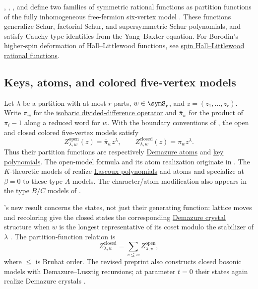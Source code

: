 , , , and
 define two families of symmetric rational functions as
partition functions of the fully inhomogeneous free-fermion six-vertex model
\cite{AggarwalBorodinPetrovWheeler2023}.  These functions generalize Schur,
factorial Schur, and supersymmetric Schur polynomials, and satisfy Cauchy-type
identities from the Yang--Baxter equation.
For Borodin's higher-spin deformation of Hall--Littlewood functions,
see \hyperref[spinHallLittlewoodRationalFunction]{spin Hall--Littlewood rational functions}.

\subsection[latticeModelDemazure]{Keys, atoms, and colored five-vertex models}

Let $\lambda$ be a partition with at most $r$ parts, $w\in\symS_r$,
and $z=(z_1,\ldots,z_r)$.
Write $\pi_w$ for the
\hyperref[keyDefinitionOperators]{isobaric divided-difference operator}
and $\bar\pi_w$ for the product of $\pi_i-1$ along a reduced word for $w$.
With the boundary conventions of \cite[Sec.~1.1]{Yang2025x}, the open and
closed colored five-vertex models satisfy
\[
 Z^{\mathrm{open}}_{\lambda,w}(z)=\bar\pi_w z^\lambda,
 \qquad
 Z^{\mathrm{closed}}_{\lambda,w}(z)=\pi_w z^\lambda.
\]
Thus their partition functions are respectively
\hyperref[atom]{Demazure atoms} and \hyperref[key]{key polynomials}.
The open-model formula and its atom realization originate in
\cite{BrubakerBuciumasBumpGustafsson2021}.
The $K$-theoretic models of
\cite[Thms.~3.4 and~3.6]{BuciumasScrimshawWeber2020} realize
\hyperref[lascoux]{Lascoux polynomials} and atoms and specialize at
$\beta=0$ to these type $A$ models.
The character/atom modification also appears in the
type $B/C$ models of \cite{BuciumasScrimshaw2022}.

's new result concerns the states, not just their generating function:
lattice moves and recoloring give the closed states the corresponding
\hyperref[crystals]{Demazure crystal} structure
when $w$ is the longest representative of its coset modulo the stabilizer
of $\lambda$ \cite[Thm.~1.2]{Yang2025x}. The partition-function relation is
\[
 Z^{\mathrm{closed}}_{\lambda,w}
 =\sum_{v\leq w} Z^{\mathrm{open}}_{\lambda,v},
\]
where $\leq$ is Bruhat order. The revised preprint also constructs closed
bosonic models with Demazure--Lusztig recursions; at parameter $t=0$ their
states again realize Demazure crystals \cite[Sec.~6]{Yang2025x}.

